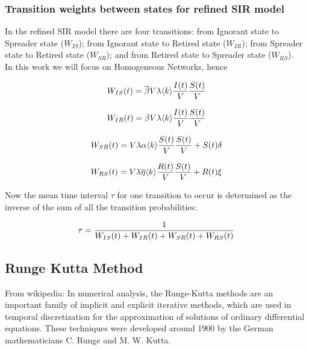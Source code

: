 \subsubsection{Transition weights between states for refined SIR model}

In the refined SIR model there are four transitions: from Ignorant state to Spreader state ($W_{IS}$); from Ignorant state to Retired state ($W_{IR}$); from Spreader state to Retired state ($W_{SR}$); and from Retired state to Spreader state ($W_{RS}$).\\
In this work we will focus on Homogeneous Networks, hence

\begin{equation}
\label{eq:refWisHomo}
W_{IS}(t)=\overline{\beta}V\lambda\langle k\rangle\frac{I(t)}{V}\frac{S(t)}{V}     \\
\end{equation}

\begin{equation}
\label{eq:refWirHomo}
W_{IR}(t)=\beta V\lambda\langle k\rangle\frac{I(t)}{V}\frac{S(t)}{V} \\
\end{equation}

\begin{equation}
\label{eq:refWsrHomo}
W_{SR}(t)=V\lambda\alpha\langle k\rangle\frac{S(t)}{V}\frac{S(t)}{V}+S(t)\delta\\
\end{equation}

\begin{equation}
\label{eq:refWrsHomo}
W_{RS}(t)=V\lambda\overline{\eta}\langle k\rangle\frac{R(t)}{V}\frac{S(t)}{V}+R(t)\xi\\
\end{equation}

Now the mean time interval $\tau$ for one transition to occur is determined as the inverse of the sum of all the transition probabilities:

\begin{equation}
\label{eq:tau}
\tau=\frac{1}{{W_{IS}(t)+W_{IR}(t)+W_{SR}(t)+W_{RS}(t)}}\\
\end{equation}

\subsection{Runge Kutta Method}
\label{sec:actual_work}

From wikipedia:
In numerical analysis, the Runge-Kutta methods are an important family of implicit and explicit iterative methods, which are used in temporal discretization for the approximation of solutions of ordinary differential equations. These techniques were developed around 1900 by the German mathematicians C. Runge and M. W. Kutta.

